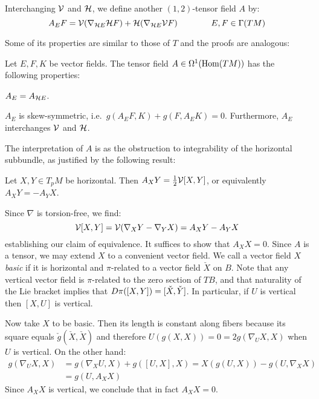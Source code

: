 \begin{mydef}
	Interchanging $\mathcal{V}$ and $\mathcal{H}$, we define another $(1,2)$-tensor field $A$ by:
	\begin{equation*}
		A_E F=\mathcal{V}(\nabla_{\mathcal{H} E}\mathcal{H} F) + \mathcal{H}(\nabla_{\mathcal{H} E} \mathcal{V} F) \qquad \qquad E,F\in\Gamma(TM)
	\end{equation*}
\end{mydef}

Some of its properties are similar to those of $T$ and the proofs are analogous:

\begin{lem}
	Let $E,F,K$ be vector fields. The tensor field $A\in\Omega^1(\operatorname{Hom}(TM))$ has the following properties:
	\begin{numberedlist}
		\item $A_E=A_{\mathcal{H} E}$.
		\item $A_E$ is skew-symmetric, i.e.~$g(A_E F,K)+g(F,A_E K)=0$. Furthermore, $A_E$ interchanges $\mathcal{V}$ and $\mathcal{H}$.\proofclear
	\end{numberedlist}
\end{lem}

The interpretation of $A$ is as the obstruction to integrability of the horizontal subbundle, as justified by the following result:

\begin{prop}
	Let $X,Y\in T_pM$ be horizontal. Then $A_X Y=\frac{1}{2}\mathcal{V} [X,Y]$, or equivalently $A_X Y=-A_Y X$.
\end{prop}
\begin{myproof}
	Since $\nabla$ is torsion-free, we find: 
	\begin{equation*}
		\mathcal{V}[X,Y]=\mathcal{V}(\nabla_X Y-\nabla_Y X)=A_X Y-A_Y X
	\end{equation*}
	establishing our claim of equivalence. It suffices to show that $A_X X=0$. Since $A$ is a tensor, we may extend $X$ to a convenient vector field. We call a vector field $X$ \emph{basic} if it is horizontal and $\pi$-related to a vector field $\check X$ on $B$. Note that any vertical vector field is $\pi$-related to the zero section of $TB$, and that naturality of the Lie bracket implies that $D \pi([X,Y])=[\check X,\check Y]$. In particular, if $U$ is vertical then $[X,U]$ is vertical.
	
	Now take $X$ to be basic. Then its length is constant along fibers because its square equals $\check g(\check X,\check X)$ and therefore $U(g(X,X))=0=2g(\nabla_U X,X)$ when $U$ is vertical. On the other hand:
	\begin{align*}
		g(\nabla_U X,X)&=g(\nabla_X U,X)+g([U,X],X)=X(g(U,X))-g(U,\nabla_X X)\\
		&=g(U,A_X X)
	\end{align*}
	Since $A_X X$ is vertical, we conclude that in fact $A_X X=0$.
\end{myproof}


